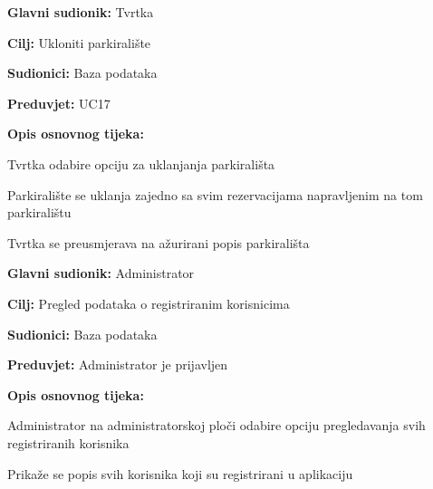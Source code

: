 \noindent {}
\begin{packed_item}
	
	\item \textbf{Glavni sudionik:} Tvrtka
	\item \textbf{Cilj:} Ukloniti parkiralište
	\item \textbf{Sudionici:} Baza podataka
	\item \textbf{Preduvjet:} UC17
	\item \textbf{Opis osnovnog tijeka:}
	
	\item[] \begin{packed_enum}
		
		\item Tvrtka odabire opciju za uklanjanja parkirališta
		\item Parkiralište se uklanja zajedno sa svim rezervacijama napravljenim na tom parkiralištu
		\item Tvrtka se preusmjerava na ažurirani popis parkirališta

	\end{packed_enum}
\end{packed_item}

\pagebreak

\noindent {}
\begin{packed_item}
	
	\item \textbf{Glavni sudionik:} Administrator
	\item  \textbf{Cilj:} Pregled podataka o registriranim korisnicima
	\item  \textbf{Sudionici:} Baza podataka
	\item  \textbf{Preduvjet:} Administrator je prijavljen
	\item  \textbf{Opis osnovnog tijeka:}
	
	\item[] \begin{packed_enum}
		
		\item Administrator na administratorskoj ploči odabire opciju pregledavanja svih registriranih korisnika 
		\item Prikaže se popis svih korisnika koji su registrirani u aplikaciju
	\end{packed_enum}
\end{packed_item}



